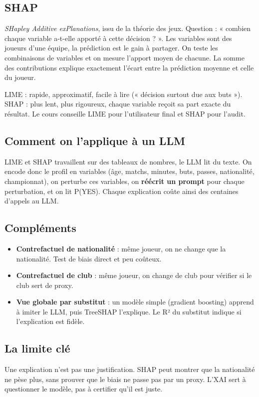 \documentclass[11pt,a4paper]{article}
\begin{document}
\subsection{SHAP}
\emph{SHapley Additive exPlanations}, issu de la théorie des jeux. Question : « combien chaque variable a-t-elle apporté à cette décision ? ». Les variables sont des joueurs d'une équipe, la prédiction est le gain à partager. On teste les combinaisons de variables et on mesure l'apport moyen de chacune. La somme des contributions explique exactement l'écart entre la prédiction moyenne et celle du joueur.

\begin{simple}
LIME : rapide, approximatif, facile à lire (« décision surtout due aux buts »). SHAP : plus lent, plus rigoureux, chaque variable reçoit sa part exacte du résultat. Le cours conseille LIME pour l'utilisateur final et SHAP pour l'audit.
\end{simple}

\subsection{Comment on l'applique à un LLM}
LIME et SHAP travaillent sur des tableaux de nombres, le LLM lit du texte. On encode donc le profil en variables (âge, matchs, minutes, buts, passes, nationalité, championnat), on perturbe ces variables, on \textbf{réécrit un prompt} pour chaque perturbation, et on lit P(YES). Chaque explication coûte ainsi des centaines d'appels au LLM.

\subsection{Compléments}
\begin{itemize}
  \item \textbf{Contrefactuel de nationalité} : même joueur, on ne change que la nationalité. Test de biais direct et peu coûteux.
  \item \textbf{Contrefactuel de club} : même joueur, on change de club pour vérifier si le club sert de proxy.
  \item \textbf{Vue globale par substitut} : un modèle simple (gradient boosting) apprend à imiter le LLM, puis TreeSHAP l'explique. Le R² du substitut indique si l'explication est fidèle.
\end{itemize}

\subsection{La limite clé}
Une explication n'est pas une justification. SHAP peut montrer que la nationalité ne pèse plus, sans prouver que le biais ne passe pas par un proxy. L'XAI sert à questionner le modèle, pas à certifier qu'il est juste.
\end{document}
